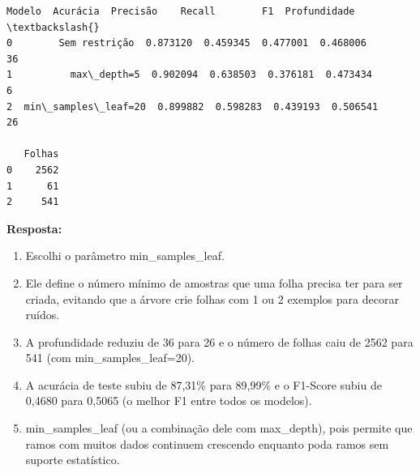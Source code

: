\documentclass[11pt]{article}
\makeatletter
\providecommand{\tightlist}{%
      \setlength{\itemsep}{0pt}\setlength{\parskip}{0pt}}
\newcommand{\boxspacing}{\kern\kvtcb@left@rule\kern\kvtcb@boxsep}
\newcommand{\prompt}[4]{
        {\ttfamily\llap{{\color{#2}[#3]:\hspace{3pt}#4}}\vspace{-\baselineskip}}
    }
\makeatother
\begin{document}
    
            \begin{tcolorbox}[breakable, size=fbox, boxrule=.5pt, pad at break*=1mm, opacityfill=0]
\prompt{Out}{outcolor}{22}{\boxspacing}
\begin{Verbatim}[commandchars=\\\{\}]
                Modelo  Acurácia  Precisão    Recall        F1  Profundidade  \textbackslash{}
0        Sem restrição  0.873120  0.459345  0.477001  0.468006            36
1          max\_depth=5  0.902094  0.638503  0.376181  0.473434             6
2  min\_samples\_leaf=20  0.899882  0.598283  0.439193  0.506541            26

   Folhas
0    2562
1      61
2     541
\end{Verbatim}
\end{tcolorbox}
        
    \textbf{Resposta:}

\begin{enumerate}
\def\labelenumi{\arabic{enumi}.}
\tightlist
\item
  Escolhi o parâmetro min\_samples\_leaf.
\item
  Ele define o número mínimo de amostras que uma folha precisa ter para
  ser criada, evitando que a árvore crie folhas com 1 ou 2 exemplos para
  decorar ruídos.
\item
  A profundidade reduziu de 36 para 26 e o número de folhas caiu de 2562
  para 541 (com min\_samples\_leaf=20).
\item
  A acurácia de teste subiu de 87,31\% para 89,99\% e o F1-Score subiu
  de 0,4680 para 0,5065 (o melhor F1 entre todos os modelos).
\item
  min\_samples\_leaf (ou a combinação dele com max\_depth), pois permite
  que ramos com muitos dados continuem crescendo enquanto poda ramos sem
  suporte estatístico.
\end{enumerate}


    
    
    
\end{document}
